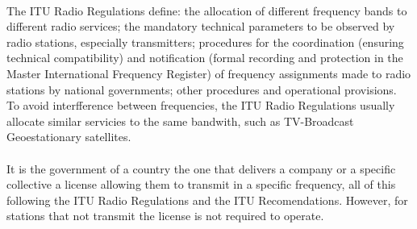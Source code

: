 \documentclass[12pt,a4paper]{report}
\begin{document}
\paragraph{}The ITU Radio Regulations define: the allocation of different frequency bands to different radio services; the mandatory technical parameters to be observed by radio stations, especially transmitters; procedures for the coordination (ensuring technical compatibility) and notification (formal recording and protection in the Master International Frequency Register) of frequency assignments made to radio stations by national governments; other procedures and operational provisions. To avoid interfference between frequencies, the ITU Radio Regulations usually allocate similar servicies to the same bandwith, such as TV-Broadcast Geoestationary satellites.

\paragraph{}It is the government of a country the one that delivers a company or a specific collective a license allowing them to transmit in a specific frequency, all of this following the ITU Radio Regulations and the ITU Recomendations. However, for stations that not transmit the license is not required to operate.
\end{document}
